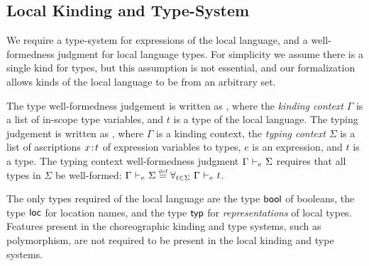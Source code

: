 \subsection{Local Kinding and Type-System}
\label{sec:local-types}
We require a type-system for expressions of the local language, and a well-formedness judgment for local language types.
For simplicity we assume there is a single kind for types, but this assumption is not essential, and our formalization allows kinds of the local language to be from an arbitrary set.

The type well-formedness judgement is written as , where the \emph{kinding context} $\Gamma$ is a list of in-scope type variables, and $t$ is a type of the local language.
The typing judgement is written as , where $\Gamma$ is a kinding context, the \emph{typing context} $\Sigma$ is a list of ascriptions $x \mkern2mu{:}\mkern2mu t$ of expression variables to types, $e$ is an expression, and $t$ is a type.
The typing context well-formedness judgment $\Gamma ~{\vdash}_{\footnotesize{e}}~ \Sigma$ requires that all types in $\Sigma$ be well-formed: $\Gamma ~{\vdash}_{\footnotesize{e}}~ \Sigma \stackrel{\text{\normalfont\tiny def}}{=} \forall_{t \in \Sigma}~\Gamma ~{\vdash}_{\footnotesize{e}}~ t$.

The only types required of the local language are the type $\mathsf{bool}$ of booleans, the type $\mathsf{loc}$ for location names, and the type $\mathsf{typ}$ for \emph{representations} of local types.
Features present in the choreographic kinding and type systems, such as polymorphism, are not required to be present in the local kinding and type systems.



